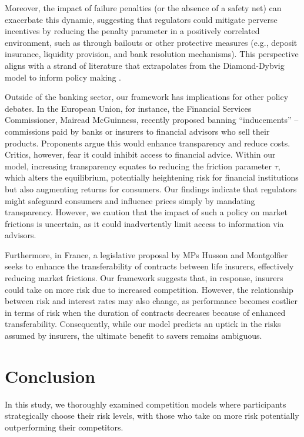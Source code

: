 \documentclass[preprint,12pt,authoryear]{elsarticle}
\theoremstyle{definition}
\begin{document}
Moreover, the impact of failure penalties (or the absence of a safety net) can exacerbate this dynamic, suggesting that regulators could mitigate perverse incentives by reducing the penalty parameter in a positively correlated environment, such as through bailouts or other protective measures (e.g., deposit insurance, liquidity provision, and bank resolution mechanisms). This perspective aligns with a strand of literature that extrapolates from the Diamond-Dybvig model to inform policy making \citep{bhattacharya1985preference,ennis2009bank}.

Outside of the banking sector, our framework has implications for other policy debates. In the European Union, for instance, the Financial Services Commissioner, Mairead McGuinness, recently proposed banning ``inducements'' – commissions paid by banks or insurers to financial advisors who sell their products. Proponents argue this would enhance transparency and reduce costs. Critics, however, fear it could inhibit access to financial advice. Within our model, increasing transparency equates to reducing the friction parameter $\tau$, which alters the equilibrium, potentially heightening risk for financial institutions but also augmenting returns for consumers. Our findings indicate that regulators might safeguard consumers and influence prices simply by mandating transparency. However, we caution that the impact of such a policy on market frictions is uncertain, as it could inadvertently limit access to information via advisors.

Furthermore, in France, a legislative proposal by MPs Husson and Montgolfier seeks to enhance the transferability of contracts between life insurers, effectively reducing market frictions. Our framework suggests that, in response, insurers could take on more risk due to increased competition. However, the relationship between risk and interest rates may also change, as performance becomes costlier in terms of risk when the duration of contracts decreases because of enhanced transferability. Consequently, while our model predicts an uptick in the risks assumed by insurers, the ultimate benefit to savers remains ambiguous.


\section{Conclusion}

In this study, we thoroughly examined competition models where participants strategically choose their risk levels, with those who take on more risk potentially outperforming their competitors. 
\end{document}
